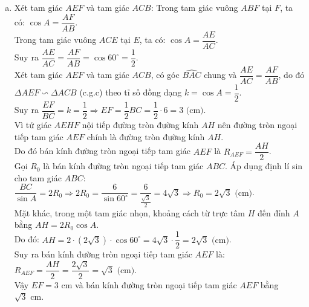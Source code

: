 \begin{bt}
{\begin{enumerate}[a)]
	Vì $AH \perp BC$ tại $K$ nên $DK \perp BC$.\\
	Xét tam giác $BDC$ vuông tại $D$ có đường cao $DK$. Áp dụng hệ thức lượng trong tam giác vuông, ta có:
	$BD^2 = BK \cdot BC$.\\
	Xét tam giác $BDK$ và tam giác $BCD$, ta có góc $\widehat{CBD}$ chung và $\dfrac{BD}{BK} = \dfrac{BC}{BD}$ (do $BD^2 = BK \cdot BC$), suy ra $\Delta BDK \backsim \Delta BCD$ (c.g.c).\\
	Do đó $\widehat{BDK} = \widehat{BCD}$, hay $\widehat{BDH} = \widehat{BCD}$.\\
	Mặt khác, trong đường tròn $(O)$, góc $\widehat{BFD}$ và góc $\widehat{BCD}$ là hai góc nội tiếp cùng chắn cung $BD$, nên $\widehat{BFD} = \widehat{BCD}$.\\
	Từ đó suy ra $\widehat{BDH} = \widehat{BFD}$.
	\item Xét tam giác $AEF$ và tam giác $ACB$:
	Trong tam giác vuông $ABF$ tại $F$, ta có: $\cos A = \dfrac{AF}{AB}$.\\
	Trong tam giác vuông $ACE$ tại $E$, ta có: $\cos A = \dfrac{AE}{AC}$.\\
	Suy ra $\dfrac{AE}{AC} = \dfrac{AF}{AB} = \cos 60^\circ = \dfrac{1}{2}$.\\
	Xét tam giác $AEF$ và tam giác $ACB$, có góc $\widehat{BAC}$ chung và $\dfrac{AE}{AC} = \dfrac{AF}{AB}$, do đó $\Delta AEF \backsim \Delta ACB$ (c.g.c) theo tỉ số đồng dạng $k = \cos A = \dfrac{1}{2}$.\\
	Suy ra $\dfrac{EF}{BC} = k = \dfrac{1}{2} \Rightarrow EF = \dfrac{1}{2}BC = \dfrac{1}{2}\cdot 6 = 3\text{ (cm)}$.\\
	Vì tứ giác $AEHF$ nội tiếp đường tròn đường kính $AH$ nên đường tròn ngoại tiếp tam giác $AEF$ chính là đường tròn đường kính $AH$.\\
	Do đó bán kính đường tròn ngoại tiếp tam giác $AEF$ là $R_{AEF} = \dfrac{AH}{2}$.\\
	Gọi $R_0$ là bán kính đường tròn ngoại tiếp tam giác $ABC$. Áp dụng định lí sin cho tam giác $ABC$:
	$\dfrac{BC}{\sin A} = 2R_0 \Rightarrow 2R_0 = \dfrac{6}{\sin 60^\circ} = \dfrac{6}{\frac{\sqrt{3}}{2}} = 4\sqrt{3} \Rightarrow R_0 = 2\sqrt{3}\text{ (cm)}$.\\
	Mặt khác, trong một tam giác nhọn, khoảng cách từ trực tâm $H$ đến đỉnh $A$ bằng $AH = 2R_0 \cos A$.\\
	Do đó: $AH = 2 \cdot (2\sqrt{3}) \cdot \cos 60^\circ = 4\sqrt{3} \cdot \dfrac{1}{2} = 2\sqrt{3}\text{ (cm)}$.\\
	Suy ra bán kính đường tròn ngoại tiếp tam giác $AEF$ là:
	$R_{AEF} = \dfrac{AH}{2} = \dfrac{2\sqrt{3}}{2} = \sqrt{3}\text{ (cm)}$.\\
	Vậy $EF = 3\text{ cm}$ và bán kính đường tròn ngoại tiếp tam giác $AEF$ bằng $\sqrt{3}\text{ cm}$.
\end{enumerate}
}
\end{bt}

